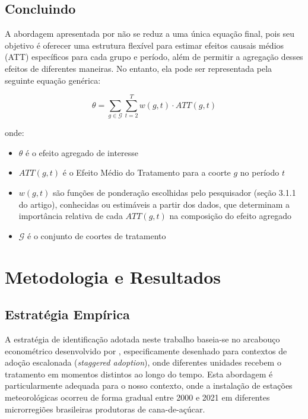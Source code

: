 \documentclass[
	12pt,				%
	openright,			%
	oneside,			%
	a4paper,			%
	english,			%
	french,				%
	spanish,			%
	brazil				%
	]{abntex2}
\begin{document}
\section{Concluindo}

A abordagem apresentada por  não se reduz a uma única equação final, pois seu objetivo é oferecer uma estrutura flexível para estimar efeitos causais médios (ATT) específicos para cada grupo e período, além de permitir a agregação desses efeitos de diferentes maneiras. No entanto, ela pode ser representada pela seguinte equação genérica:

\begin{equation}
\theta = \sum_{g \in \mathcal{G}} \sum_{t=2}^{T} w(g,t) \cdot ATT(g,t)
\end{equation}

onde:
\begin{itemize}
\item $\theta$ é o efeito agregado de interesse
\item $ATT(g,t)$ é o Efeito Médio do Tratamento para a coorte $g$ no período $t$
\item $w(g,t)$ são funções de ponderação escolhidas pelo pesquisador (seção 3.1.1 do artigo), conhecidas ou estimáveis a partir dos dados, que determinam a importância relativa de cada $ATT(g,t)$ na composição do efeito agregado
\item $\mathcal{G}$ é o conjunto de coortes de tratamento
\end{itemize}

\chapter{Metodologia e Resultados}

\section{Estratégia Empírica}

A estratégia de identificação adotada neste trabalho baseia-se no arcabouço econométrico desenvolvido por , especificamente desenhado para contextos de adoção escalonada (\textit{staggered adoption}), onde diferentes unidades recebem o tratamento em momentos distintos ao longo do tempo. Esta abordagem é particularmente adequada para o nosso contexto, onde a instalação de estações meteorológicas ocorreu de forma gradual entre 2000 e 2021 em diferentes microrregiões brasileiras produtoras de cana-de-açúcar.
\end{document}
